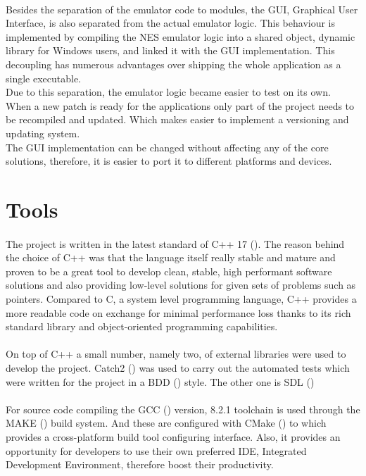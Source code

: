 \documentclass[]{report}
\begin{document}
\paragraph{ }
Besides the separation of the emulator code to modules, the GUI, Graphical User Interface,  is also separated from the actual emulator logic. This behaviour is implemented by compiling the NES emulator logic into a shared object, dynamic library for Windows users, and linked it with the GUI implementation. This decoupling has numerous advantages over shipping the whole application as a single executable.
\\ 
Due to this separation, the emulator logic became easier to test on its own. 
\\ 
When a new patch is ready for the applications only part of the project needs to be recompiled and updated. Which makes easier to implement a versioning and updating system.
\\ 
The GUI implementation can be changed without affecting any of the core solutions, therefore, it is easier to port it to different platforms and devices.

\section{Tools}
\paragraph{ }
The project is written in the latest standard of C++ 17 (\cite{CPPV}). The reason behind the choice of C++ was that the language itself really stable and mature and proven to be a great tool to develop clean, stable, high performant software solutions and also providing low-level solutions for given sets of problems such as pointers. Compared to C, a system level programming language, C++ provides a more readable code on exchange for minimal performance loss thanks to its rich standard library and object-oriented programming capabilities.

\paragraph{ }
On top of C++ a small number, namely two, of external libraries were used to develop the project.
Catch2 (\cite{CTCH}) was used to carry out the automated tests which were written for the project in a BDD (\cite{BDDT}) style.
The other one is SDL (\cite{SDL2})

\paragraph{ }
For source code compiling the GCC (\cite{GCCV}) version, 8.2.1 toolchain is used through the MAKE (\cite{MAKE}) build system. And these are configured with CMake (\cite{CMKE}) to which provides a cross-platform build tool configuring interface. Also, it provides an opportunity for developers to use their own preferred IDE, Integrated Development Environment, therefore boost their productivity.
\end{document}
